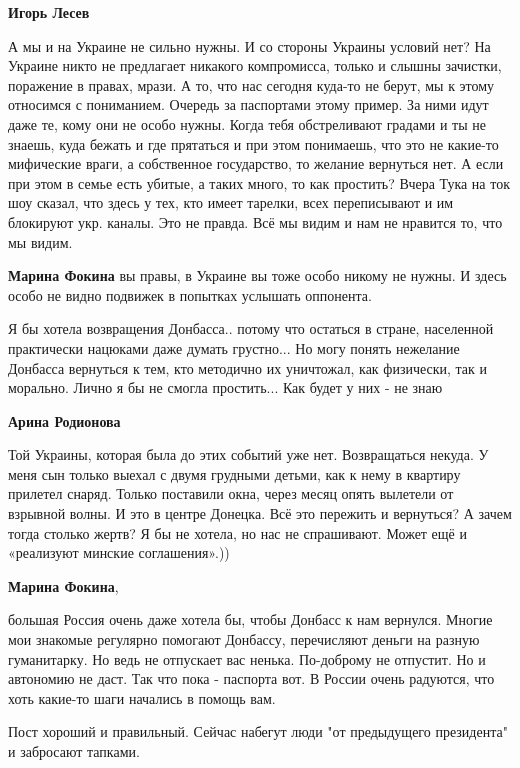 \begin{itemize}
\begin{itemize}
\textbf{Игорь Лесев} 

А мы и на Украине не сильно нужны. И со стороны Украины условий нет? На Украине
никто не предлагает никакого компромисса, только и слышны зачистки, поражение в
правах, мрази. А то, что нас сегодня куда-то не берут, мы к этому относимся с
пониманием. Очередь за паспортами этому пример. За ними идут даже те, кому они
не особо нужны. Когда тебя обстреливают градами и ты не знаешь, куда бежать и
где прятаться и при этом понимаешь, что это не какие-то мифические враги, а
собственное государство, то желание вернуться нет. А если при этом в семье есть
убитые, а таких много, то как простить? Вчера Тука на ток шоу сказал, что здесь у
тех, кто имеет тарелки, всех переписывают и им блокируют укр. каналы. Это не
правда. Всё мы видим и нам не нравится то, что мы видим.

\textbf{Марина Фокина} вы правы, в Украине вы тоже особо никому не нужны. И здесь особо не видно подвижек в попытках услышать оппонента.


Я бы хотела возвращения Донбасса.. потому что остаться в стране, населенной
практически нацюками даже думать грустно... Но могу понять нежелание Донбасса
вернуться к тем, кто методично их уничтожал, как физически, так и морально.
Лично я бы не смогла простить... Как будет у них - не знаю

\textbf{Арина Родионова} 

Той Украины, которая была до этих событий уже нет. Возвращаться некуда. У меня
сын только выехал с двумя грудными детьми, как к нему в квартиру прилетел
снаряд. Только поставили окна, через месяц опять вылетели от взрывной волны. И
это в центре Донецка. Всё это пережить и вернуться? А зачем тогда столько
жертв? Я бы не хотела, но нас не спрашивают. Может ещё и «реализуют минские
соглашения».))

\textbf{Марина Фокина}, 

большая Россия очень даже хотела бы, чтобы Донбасс к нам вернулся. Многие мои
знакомые регулярно помогают Донбассу, перечисляют деньги на разную гуманитарку.
Но ведь не отпускает вас ненька. По-доброму не отпустит. Но и автономию не
даст. Так что пока - паспорта вот. В России очень радуются, что хоть какие-то
шаги начались в помощь вам.

\end{itemize} %

Пост хороший и правильный.
Сейчас набегут люди "от предыдущего президента" и забросают тапками.


\end{itemize}
